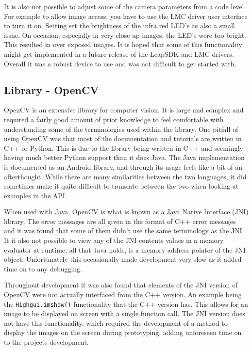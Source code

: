 \documentclass[11pt,oneside]{report}
\newcommand\code[1]{\texttt{#1}}
\begin{document}
			It is also not possible to adjust some of the camera parameters from a code level.
			For example to allow image access, you have to use the LMC driver user interface to turn it on.
			Setting set the brightness of the infra red LED's as also a small issue.
			On occasion, especially in very close up images, the LED's were too bright.
			This resulted in over exposed images.
			It is hoped that some of this functionality might get implemented in a future release of the LeapSDK and LMC drivers.
			Overall it was a robust device to use and was not difficult to get started with.
		\subsection{Library - OpenCV}
			
			OpenCV is an extensive library for computer vision.
			It is large and complex and required a fairly good amount of prior knowledge to feel comfortable with understanding some of the terminologies used within the library.
			One pitfall of using OpenCV was that most of the documentation and tutorials are written in C++ or Python.
			This is due to the library being written in C++ and seemingly having much better Python support than it does Java.
			The Java implementation is documented as an Android library, and through its usage feels like a bit of an afterthought.
			While there are many similarities between the two languages, it did sometimes make it quite difficult to translate between the two when looking at examples in the API.
			
			When used with Java, OpenCV is what is known as a Java Native Interface (JNI) library.
			The error messages are all given in the format of C++ error messages and it was found that some of them didn't use the same terminology as the JNI.
			It it also not possible to view any of the JNI contents values in a memory evaluator at runtime, all that Java holds, is a memory address pointer of the JNI object.
			Unfortunately this occasionally made development very slow as it added time on to any debugging.
			
			Throughout development it was also found that elements of the JNI version of OpenCV were not actually interfaced from the C++ version.
			An example being the \code{Highgui.imshow()} functionality that the C++ version has.
			This allows for an image to be displayed on screen with a single function call.
			The JNI version does not have this functionality, which required the development of a method to display the images on the screen during prototyping, adding unforeseen time on to the projects development.
\end{document}
